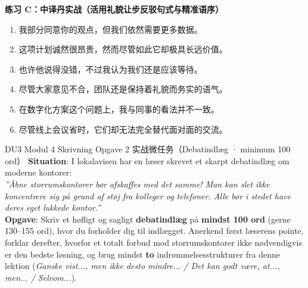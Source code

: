 \textbf{练习 C：中译丹实战（活用礼貌让步反驳句式与精准语序）}
\begin{enumerate}
  \item 我部分同意你的观点，但我们依然需要更多数据。
  \item 这项计划诚然很昂贵，然而尽管如此它却极具长远价值。
  \item 也许他说得没错，不过我认为我们还是应该等待。
  \item 尽管大家意见不合，团队还是保持着礼貌而务实的语气。
  \item 在数字化方案这个问题上，我与同事的看法并不一致。
  \item 尽管线上会议省时，它们却无法完全替代面对面的交流。
\end{enumerate}


\begin{emailbox}{DU3 Modul 4 Skrivning Opgave 2 实战微任务（Debatindlæg · minimum 100 ord）}
\textbf{Situation}: I lokalavisen har en læser skrevet et skarpt debatindlæg om moderne kontorer:\\
\textit{”Åbne storrumskontorer bør afskaffes med det samme! Man kan slet ikke koncentrere sig på grund af støj fra kolleger og telefoner. Alle bør i stedet have deres eget lukkede kontor.”}\\[3pt]
\textbf{Opgave}: Skriv et høfligt og sagligt \textbf{debatindlæg} på \textbf{mindst 100 ord} (gerne 130--155 ord), hvor du forholder dig til indlægget. Anerkend først læserens pointe, forklar derefter, hvorfor et totalt forbud mod storrumskontorer ikke nødvendigvis er den bedste løsning, og brug mindst \textbf{to} indrømmelsesstrukturer fra denne lektion (\textit{Ganske vist..., men ikke desto mindre... / Det kan godt være, at..., men... / Selvom...}).
\end{emailbox}

